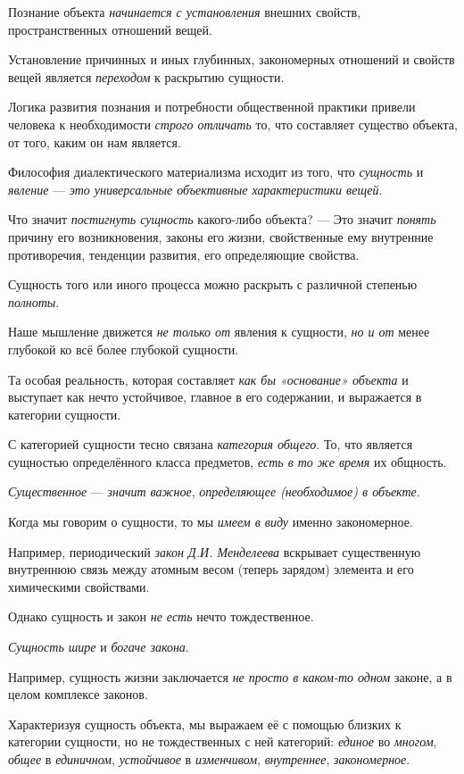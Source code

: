 \documentclass[a4paper,14pt,russian]{extreport}
\begin{document}
Познание объекта \emph{начинается с установления} внешних свойств, пространственных отношений вещей.

Установление причинных и иных глубинных, закономерных отношений и свойств вещей является \emph{переходом} к раскрытию сущности.

Логика развития познания и потребности общественной практики привели человека к необходимости \emph{строго отличать} то, что составляет существо объекта, от того, каким он нам является.

Философия диалектического материализма исходит из того, что \emph{сущность} и \emph{явление} --- \emph{это универсальные объективные характеристики вещей}.

Что значит \emph{постигнуть сущность} какого-либо объекта? --- Это значит \emph{понять} причину его возникновения, законы его жизни, свойственные ему внутренние противоречия, тенденции развития, его определяющие свойства.

Сущность того или иного процесса можно раскрыть с различной степенью \emph{полноты}.

Наше мышление движется \emph{не только от} явления к сущности, \emph{но и от} менее глубокой ко всё более глубокой сущности.

Та особая реальность, которая составляет \emph{как бы «основание» объекта} и выступает как нечто устойчивое, главное в его содержании, и выражается в категории сущности.

С категорией сущности тесно связана \emph{категория общего}. То, что является сущностью определённого класса предметов, \emph{есть в то же время} их общность.

\emph{Существенное} --- \emph{значит важное}, \emph{определяющее (необходимое) в объекте}.

Когда мы говорим о сущности, то мы \emph{имеем в виду} именно закономерное.

Например, периодический \emph{закон Д.И. Менделеева} вскрывает существенную внутреннюю связь между атомным весом (теперь зарядом) элемента и его химическими свойствами.

Однако сущность и закон \emph{не есть} нечто тождественное.

\emph{Сущность шире} и \emph{богаче закона}.

Например, сущность жизни заключается \emph{не просто в каком-то одном} законе, а в целом комплексе законов.

Характеризуя сущность объекта, мы выражаем её с помощью близких к категории сущности, но не тождественных с ней категорий: \emph{единое} во \emph{многом}, \emph{общее} в \emph{единичном}, \emph{устойчивое} в \emph{изменчивом}, \emph{внутреннее}, \emph{закономерное}.
\end{document}
